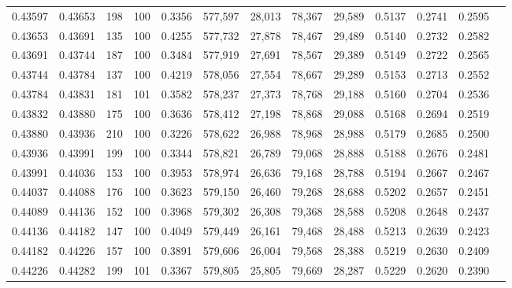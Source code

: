 \begin{tabular}{rrrrrrrrrrrrr}
0.43597 & 0.43653 &   198 & 100 &                                     0.3356 & 577,597 &  28,013 &  78,367 &  29,589 & 0.5137 & 0.2741 & 0.2595 \\
0.43653 & 0.43691 &   135 & 100 &                                     0.4255 & 577,732 &  27,878 &  78,467 &  29,489 & 0.5140 & 0.2732 & 0.2582 \\
0.43691 & 0.43744 &   187 & 100 &                                     0.3484 & 577,919 &  27,691 &  78,567 &  29,389 & 0.5149 & 0.2722 & 0.2565 \\
0.43744 & 0.43784 &   137 & 100 &                                     0.4219 & 578,056 &  27,554 &  78,667 &  29,289 & 0.5153 & 0.2713 & 0.2552 \\
0.43784 & 0.43831 &   181 & 101 &                                     0.3582 & 578,237 &  27,373 &  78,768 &  29,188 & 0.5160 & 0.2704 & 0.2536 \\
0.43832 & 0.43880 &   175 & 100 &                                     0.3636 & 578,412 &  27,198 &  78,868 &  29,088 & 0.5168 & 0.2694 & 0.2519 \\
0.43880 & 0.43936 &   210 & 100 &                                     0.3226 & 578,622 &  26,988 &  78,968 &  28,988 & 0.5179 & 0.2685 & 0.2500 \\
0.43936 & 0.43991 &   199 & 100 &                                     0.3344 & 578,821 &  26,789 &  79,068 &  28,888 & 0.5188 & 0.2676 & 0.2481 \\
0.43991 & 0.44036 &   153 & 100 &                                     0.3953 & 578,974 &  26,636 &  79,168 &  28,788 & 0.5194 & 0.2667 & 0.2467 \\
0.44037 & 0.44088 &   176 & 100 &                                     0.3623 & 579,150 &  26,460 &  79,268 &  28,688 & 0.5202 & 0.2657 & 0.2451 \\
0.44089 & 0.44136 &   152 & 100 &                                     0.3968 & 579,302 &  26,308 &  79,368 &  28,588 & 0.5208 & 0.2648 & 0.2437 \\
0.44136 & 0.44182 &   147 & 100 &                                     0.4049 & 579,449 &  26,161 &  79,468 &  28,488 & 0.5213 & 0.2639 & 0.2423 \\
0.44182 & 0.44226 &   157 & 100 &                                     0.3891 & 579,606 &  26,004 &  79,568 &  28,388 & 0.5219 & 0.2630 & 0.2409 \\
0.44226 & 0.44282 &   199 & 101 &                                     0.3367 & 579,805 &  25,805 &  79,669 &  28,287 & 0.5229 & 0.2620 & 0.2390 \\

\end{tabular}
